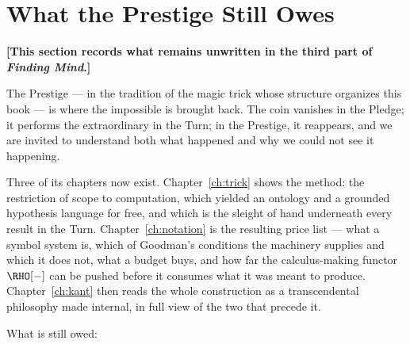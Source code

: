 \chapter*{What the Prestige Still Owes}

\noindent\textbf{[This section records what remains unwritten in the
third part of \emph{Finding Mind}.]}

\bigskip

The Prestige --- in the tradition of the magic trick whose structure
organizes this book --- is where the impossible is brought back. The
coin vanishes in the Pledge; it performs the extraordinary in the
Turn; in the Prestige, it reappears, and we are invited to understand
both what happened and why we could not see it happening.

Three of its chapters now exist.
Chapter~\ref{ch:trick} shows the method: the restriction of scope to
computation, which yielded an ontology and a grounded hypothesis
language for free, and which is the sleight of hand underneath every
result in the Turn.
Chapter~\ref{ch:notation} is the resulting price list --- what a
symbol system is, which of Goodman's conditions the machinery
supplies and which it does not, what a budget buys, and how far the
calculus-making functor $\RHO[-]$ can be pushed before it consumes
what it was meant to produce.
Chapter~\ref{ch:kant} then reads the whole construction as a
transcendental philosophy made internal, in full view of the two
that precede it.

\bigskip

What is still owed:

